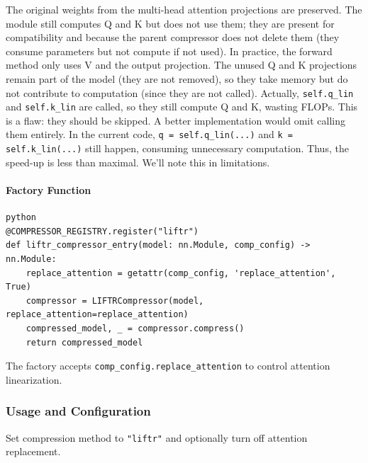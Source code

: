 The original weights from the multi-head attention projections are preserved. The module still computes Q and K but does not use them; they are present for compatibility and because the parent compressor does not delete them (they consume parameters but not compute if not used). In practice, the forward method only uses V and the output projection. The unused Q and K projections remain part of the model (they are not removed), so they take memory but do not contribute to computation (since they are not called). Actually, \texttt{self.q\_lin} and \texttt{self.k\_lin} are called, so they still compute Q and K, wasting FLOPs. This is a flaw: they should be skipped. A better implementation would omit calling them entirely. In the current code, \texttt{q = self.q\_lin(...)} and \texttt{k = self.k\_lin(...)} still happen, consuming unnecessary computation. Thus, the speed-up is less than maximal. We'll note this in limitations.

\paragraph{Factory Function}

\vspace{0.5em}
\begin{mdframed}[backgroundcolor=codebg, linecolor=codeframe, linewidth=1pt, roundcorner=4pt, innerleftmargin=2pt, innerrightmargin=5pt, innertopmargin=5pt, innerbottommargin=5pt]
\begin{lstlisting}
python
@COMPRESSOR_REGISTRY.register("liftr")
def liftr_compressor_entry(model: nn.Module, comp_config) -> nn.Module:
    replace_attention = getattr(comp_config, 'replace_attention', True)
    compressor = LIFTRCompressor(model, replace_attention=replace_attention)
    compressed_model, _ = compressor.compress()
    return compressed_model
\end{lstlisting}
\end{mdframed}
\vspace{0.5em}

The factory accepts \texttt{comp\_config.replace\_attention} to control attention linearization.


\subsubsection*{Usage and Configuration}

Set compression method to \texttt{"liftr"} and optionally turn off attention replacement.

